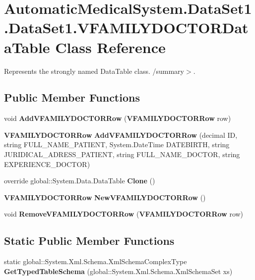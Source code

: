 \section{AutomaticMedicalSystem.DataSet1.DataSet1.VFAMILYDOCTORDataTable Class Reference}
\label{class_automatic_medical_system_1_1_data_set1_1_1_v_f_a_m_i_l_y_d_o_c_t_o_r_data_table}
Represents the strongly named DataTable class. /summary$>$.  


\subsection*{Public Member Functions}
\begin{CompactItemize}
\item 
void \textbf{AddVFAMILYDOCTORRow} ({\bf VFAMILYDOCTORRow} row)\label{class_automatic_medical_system_1_1_data_set1_1_1_v_f_a_m_i_l_y_d_o_c_t_o_r_data_table_bed327206d07ee0cc49fa9526afbd73c}

\item 
{\bf VFAMILYDOCTORRow} \textbf{AddVFAMILYDOCTORRow} (decimal ID, string FULL\_\-NAME\_\-PATIENT, System.DateTime DATEBIRTH, string JURIDICAL\_\-ADRESS\_\-PATIENT, string FULL\_\-NAME\_\-DOCTOR, string EXPERIENCE\_\-DOCTOR)\label{class_automatic_medical_system_1_1_data_set1_1_1_v_f_a_m_i_l_y_d_o_c_t_o_r_data_table_227eaae56b41cb2fc85212f9693a3f1f}

\item 
override global::System.Data.DataTable \textbf{Clone} ()\label{class_automatic_medical_system_1_1_data_set1_1_1_v_f_a_m_i_l_y_d_o_c_t_o_r_data_table_a8b0a2cf0f6e3bbd2b57ca55dceb3198}

\item 
{\bf VFAMILYDOCTORRow} \textbf{NewVFAMILYDOCTORRow} ()\label{class_automatic_medical_system_1_1_data_set1_1_1_v_f_a_m_i_l_y_d_o_c_t_o_r_data_table_2bad0e2ab72cf067c443e6cbed75a734}

\item 
void \textbf{RemoveVFAMILYDOCTORRow} ({\bf VFAMILYDOCTORRow} row)\label{class_automatic_medical_system_1_1_data_set1_1_1_v_f_a_m_i_l_y_d_o_c_t_o_r_data_table_61894821e75a1234775d3472be463055}

\end{CompactItemize}
\subsection*{Static Public Member Functions}
\begin{CompactItemize}
\item 
static global::System.Xml.Schema.XmlSchemaComplexType \textbf{GetTypedTableSchema} (global::System.Xml.Schema.XmlSchemaSet xs)\label{class_automatic_medical_system_1_1_data_set1_1_1_v_f_a_m_i_l_y_d_o_c_t_o_r_data_table_5a17d63abd56d7b25a78bf55ae3ebf9b}

\end{CompactItemize}
